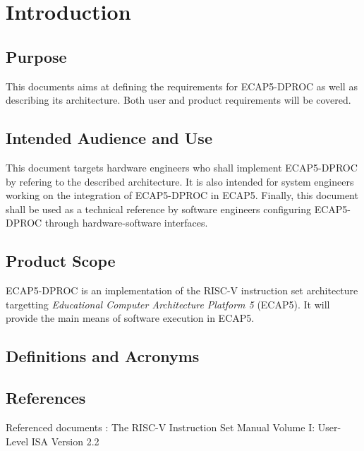 \section{Introduction}
\subsection{Purpose}

\begin{content}
This documents aims at defining the requirements for ECAP5-DPROC as well as describing its architecture. Both user and product requirements will be covered.
\end{content}

\subsection{Intended Audience and Use}

\begin{content}
This document targets hardware engineers who shall implement ECAP5-DPROC by refering to the described architecture. It is also intended for system engineers working on the integration of ECAP5-DPROC in ECAP5. Finally, this document shall be used as a technical reference by software engineers configuring ECAP5-DPROC through hardware-software interfaces.
\end{content}

\subsection{Product Scope}

\begin{content}
  ECAP5-DPROC is an implementation of the RISC-V instruction set architecture targetting \textit{Educational Computer Architecture Platform 5} (ECAP5). It will provide the main means of software execution in ECAP5.
\end{content}

\subsection{Definitions and Acronyms}

\subsection{References}

Referenced documents : The RISC-V Instruction Set Manual Volume I: User-Level ISA Version 2.2

\newpage
